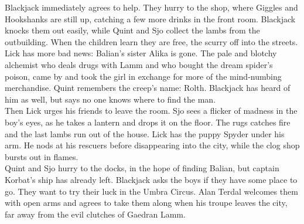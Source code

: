 Blackjack immediately agrees to help. They hurry to the shop, where Giggles and Hookshanks are still up, catching a few more drinks in the front room. Blackjack knocks them out easily, while Quint and Sjo collect the lambs from the outbuilding. When the children learn they are free, the scurry off into the streets. Lick has more bad news: Balian's sister Alika is gone. The pale and blotchy alchemist who deals drugs with Lamm and who bought the dream spider's poison, came by and took the girl in exchange for more of the mind-numbing merchandise. Quint remembers the creep's name: Rolth. Blackjack has heard of him as well, but says no one knows where to find the man.\\

Then Lick urges his friends to leave the room. Sjo sees a flicker of madness in the boy's eyes, as he takes a lantern and drops it on the floor. The rugs catches fire and the last lambs run out of the house. Lick has the puppy Spyder under his arm. He nods at his rescuers before disappearing into the city, while the clog shop bursts out in flames.\\

Quint and Sjo hurry to the docks, in the hope of finding Balian, but captain Korbat's ship has already left. Blackjack asks the boys if they have some place to go. They want to try their luck in the Umbra Circus. Alan Terdal welcomes them with open arms and agrees to take them along when his troupe leaves the city, far away from the evil clutches of Gaedran Lamm.\\

